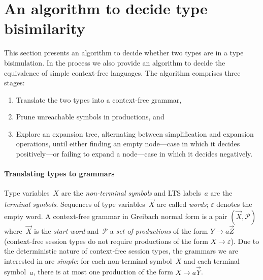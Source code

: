 \section{An algorithm to decide type bisimilarity}
\label{sec:algorithm}



This section presents an algorithm to decide whether two types are in
a type bisimulation. In the process we also provide an algorithm to
decide the equivalence of simple context-free languages.
%
The algorithm comprises three stages:
%
\begin{enumerate}
\item Translate the two types into a context-free grammar,
\item Prune unreachable symbols in productions, and
\item Explore an expansion tree, alternating between simplification
  and expansion operations, until either finding an empty node---case
  in which it decides positively---or failing to expand a node---case
  in which it decides negatively.
\end{enumerate}

\paragraph{Translating types to grammars}


Type variables~$X$ are the \emph{non-terminal symbols} and LTS
labels~$a$ are the \emph{terminal symbols}. Sequences of type
variables~$\vec X$ are called \emph{words}; $\varepsilon$ denotes the
empty word.
%
A context-free grammar in Greibach normal form is a pair
$(\vec X,\mathcal P)$ where~$\vec X$ is the \emph{start word}
and~$\mathcal P$ a \emph{set of productions} of the form
$Y \rightarrow a\vec Z$ (context-free session types do not require
productions of the form $X \rightarrow\varepsilon$).
%
Due to the deterministic nature of context-free session types, the
grammars we are interested in are \emph{simple}: for each
non-terminal symbol~$X$ and each terminal symbol~$a$, there is at most
one production of the form $X \rightarrow a\vec Y$.

